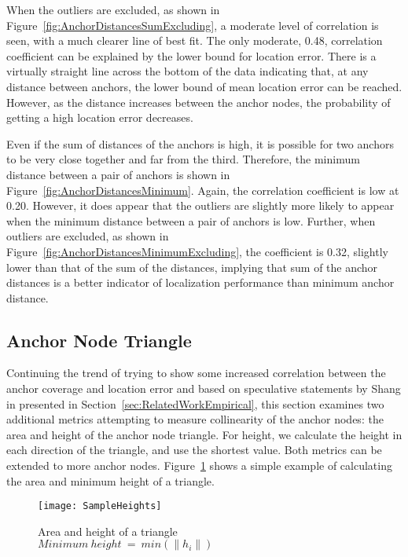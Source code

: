When the outliers are excluded, as shown in Figure~\ref{fig:AnchorDistancesSumExcluding}, a moderate level of correlation is seen, with a much clearer line of best fit.  The only moderate, 0.48, correlation coefficient can be explained by the lower bound for location error.  There is a virtually straight line across the bottom of the data indicating that, at any distance between anchors, the lower bound of mean location error can be reached.  However, as the distance increases between the anchor nodes, the probability of getting a high location error decreases.

Even if the sum of distances of the anchors is high, it is possible for two anchors to be very close together and far from the third.  Therefore, the minimum distance between a pair of anchors is shown in Figure~\ref{fig:AnchorDistancesMinimum}.  Again, the correlation coefficient is low at 0.20.  However, it does appear that the outliers are slightly more likely to appear when the minimum distance between a pair of anchors is low.  Further, when outliers are excluded, as shown in Figure~\ref{fig:AnchorDistancesMinimumExcluding}, the coefficient is 0.32, slightly lower than that of the sum of the distances, implying that sum of the anchor distances is a better indicator of localization performance than minimum anchor distance.

\subsection{Anchor Node Triangle}
\label{sec:anchorTriangle}
Continuing the trend of trying to show some increased correlation between the anchor coverage and location error and based on speculative statements by Shang in \cite[p. 964]{MDS-MAP} presented in Section~\ref{sec:RelatedWorkEmpirical}, this section examines two additional metrics attempting to measure collinearity of the anchor nodes: the area and height of the anchor node triangle.  For height, we calculate the height in each direction of the triangle, and use the shortest value.  Both metrics can be extended to more anchor nodes.  Figure~\ref{fig:SampleHeights} shows a simple example of calculating the area and minimum height of a triangle.

\begin{figure}
  \centering
	\texttt{[image: SampleHeights]}
	\caption[Area and height of a triangle]{Area and height of a triangle \\ 
	$Minimum~height~=~min(\| h_i \|)$}
	\label{fig:SampleHeights}
\end{figure}

